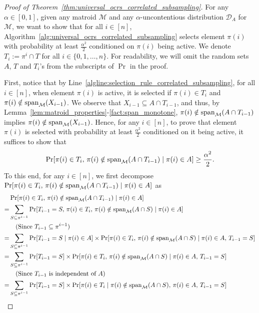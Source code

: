 \documentclass[11pt]{article}
\newcommand{\D}{\mathcal D}
\newcommand{\M}{{\mathcal M}}
\newcommand{\spa}{\textnormal{span}}
\begin{document}
\begin{proof}[Proof of Theorem~\ref{thm:universal_ocrs_correlated_subsampling}]
For any $\alpha\in[0,1]$, given any matroid $\M$ and any $\alpha$-uncontentious distribution $\D_A$ for $\M$, we want to show that for all $i\in[n]$, Algorithm~\ref{alg:universal_ocrs_correlated_subsampling} selects element $\pi(i)$ with probability at least $\frac{\alpha^2}{2}$ conditioned on $\pi(i)$ being active. We denote $T_{i}:=\pi^{i}\cap T$ for all $i\in\{0,1,\dots,n\}$. For readability, we will omit the random sets $A$, $T$ and $T_i$'s from the subscripts of $\Pr$ in the proof.

First, notice that by Line~\ref{algline:selection_rule_correlated_subsampling}, for all $i\in[n]$, when element $\pi(i)$ is active, it is selected if $\pi(i)\in T_i$ and $\pi(i)\notin\spa_{\M}(X_{i-1})$. We observe that $X_{i-1}\subseteq A\cap T_{i-1}$, and thus, by Lemma~\ref{lem:matroid_properties}-\ref{fact:span_monotone}, $\pi(i)\notin\spa_{\M}(A\cap T_{i-1})$ implies $\pi(i)\notin\spa_{\M}(X_{i-1})$. Hence, for any $i\in[n]$, to prove that element $\pi(i)$ is selected with probability at least $\frac{\alpha^2}{2}$ conditioned on it being active, it suffices to show that
\begin{equation}\label{eq:probability_of_pi(i)_being_selected}
\Pr[\pi(i)\in T_i,\,\pi(i)\notin\spa_{\M}(A\cap T_{i-1})\mid \pi(i)\in A]\ge\frac{\alpha^2}{2}.
\end{equation}
To this end, for any $i\in[n]$, we first decompose $\Pr[\pi(i)\in T_i,\,\pi(i)\notin\spa_{\M}(A\cap T_{i-1})\mid \pi(i)\in A]$ as
\begin{align*}
    &\Pr[\pi(i)\in T_i,\,\pi(i)\notin\spa_{\M}(A\cap T_{i-1})\mid \pi(i)\in A]\nonumber\\
    =&\sum_{S\subseteq\pi^{i-1}} \Pr[T_{i-1}=S,\,\pi(i)\in T_i,\,\pi(i)\notin\spa_{\M}(A\cap S)\mid \pi(i)\in A]\nonumber\\
    &\quad\text{(Since $T_{i-1}\subseteq\pi^{i-1}$)}\nonumber\\
    =&\sum_{S\subseteq\pi^{i-1}} \Pr[T_{i-1}=S\mid \pi(i)\in A]\times\Pr[\pi(i)\in T_i,\,\pi(i)\notin\spa_{\M}(A\cap S)\mid \pi(i)\in A,\,T_{i-1}=S]\nonumber\\
    =&\sum_{S\subseteq\pi^{i-1}} \Pr[T_{i-1}=S]\times\Pr[\pi(i)\in T_i,\,\pi(i)\notin\spa_{\M}(A\cap S)\mid \pi(i)\in A,\,T_{i-1}=S]\nonumber\\
    &\quad\text{(Since $T_{i-1}$ is independent of $A$)}\nonumber\\
    =&\sum_{S\subseteq\pi^{i-1}} \Pr[T_{i-1}=S]\times\Pr[\pi(i)\in T_i\mid \pi(i)\notin\spa_{\M}(A\cap S),\,\pi(i)\in A,\,T_{i-1}=S]\nonumber\\

\end{align*}
\end{proof}
\end{document}
